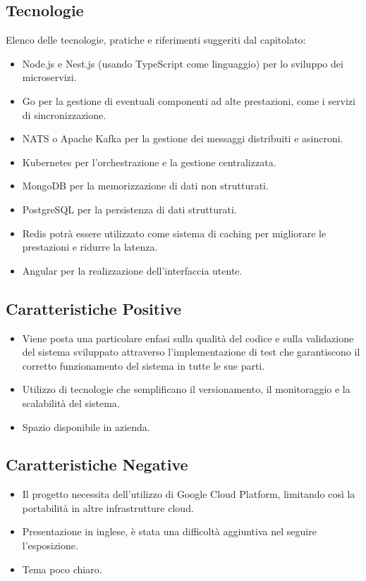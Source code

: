 \documentclass[a4paper,12pt]{article}
\begin{document}
    \subsection{Tecnologie}
    Elenco delle tecnologie, pratiche e riferimenti suggeriti dal capitolato:
    \begin{itemize}
		\item Node.js e Nest.js (usando TypeScript come linguaggio) per lo sviluppo dei microservizi.
		\item Go per la gestione di eventuali componenti ad alte prestazioni, come i servizi di sincronizzazione.
		\item NATS o Apache Kafka per la gestione dei messaggi distribuiti e asincroni.
		\item Kubernetes per l’orchestrazione e la gestione centralizzata.
		\item MongoDB per la memorizzazione di dati non strutturati.
		\item PostgreSQL per la persistenza di dati strutturati.
		\item Redis potrà essere utilizzato come sistema di caching per migliorare le prestazioni e ridurre la latenza.
		\item Angular per la realizzazione dell’interfaccia utente.
    \end{itemize}

    \subsection{Caratteristiche Positive}
    \begin{itemize}
		\item Viene posta una particolare enfasi sulla qualità del codice e sulla validazione del sistema sviluppato attraverso l’implementazione di test che garantiscono il corretto funzionamento del sistema in tutte le sue parti.
		\item Utilizzo di tecnologie che semplificano il versionamento, il monitoraggio e la scalabilità del sistema.
		\item Spazio disponibile in azienda.
    \end{itemize}
    \subsection{Caratteristiche Negative}
    \begin{itemize}
		\item Il progetto necessita dell’utilizzo di Google Cloud Platform, limitando così la portabilità in altre infrastrutture cloud.
		\item Presentazione in inglese, è stata una difficoltà aggiuntiva nel seguire l’esposizione.
		\item Tema poco chiaro.
    \end{itemize}
\end{document}
